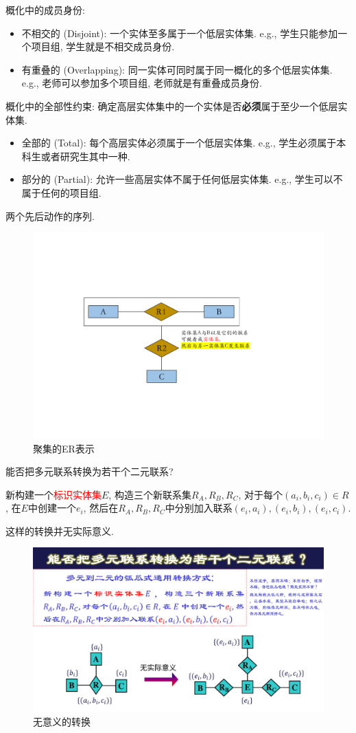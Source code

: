 概化中的成员身份:
\begin{itemize}
    \item 不相交的 (Disjoint): 一个实体至多属于一个低层实体集. e.g., 学生只能参加一个项目组, 学生就是不相交成员身份.
    \item 有重叠的 (Overlapping): 同一实体可同时属于同一概化的多个低层实体集. e.g., 老师可以参加多个项目组, 老师就是有重叠成员身份.
\end{itemize}

概化中的全部性约束: 确定高层实体集中的一个实体是否\textbf{必须}属于至少一个低层实体集.
\begin{itemize}
    \item 全部的 (Total): 每个高层实体必须属于一个低层实体集. e.g., 学生必须属于本科生或者研究生其中一种.
    \item 部分的 (Partial): 允许一些高层实体不属于任何低层实体集. e.g., 学生可以不属于任何的项目组.
\end{itemize}

\begin{definition}[聚集]
    两个先后动作的序列.
\end{definition}

\begin{figure}[H]
    \centering
    \includegraphics[width=.5\textwidth]{figure/聚集.pdf}
    \caption{聚集的ER表示}
\end{figure}


\begin{example}
    能否把多元联系转换为若干个二元联系?
\end{example}

新构建一个\textcolor{red}{标识实体集}$E$, 构造三个新联系集$R_A, R_B, R_C$, 对于每个$(a_i,b_i,c_i)\in R$, 在$E$中创建一个$e_i$, 然后在$R_A, R_B, R_C$中分别加入联系$(e_i,a_i),(e_i,b_i),(e_i,c_i)$.

这样的转换并无实际意义.

\begin{figure}[H]
    \centering
    \includegraphics[width=.8\textwidth]{figure/无意义转换.pdf}
    \caption{无意义的转换}
\end{figure}


